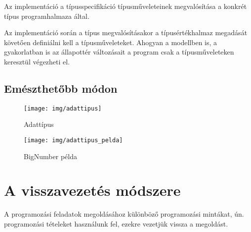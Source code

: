\documentclass[margin=0px]{article}
\begin{document}
Az implementáció a típusspecifikáció típusműveleteinek megvalósítása a konkrét típus programhalmaza által.

Az implementáció során a típus megvalósításakor a típusértékhalmaz megadását követően definiálni kell a típusműveleteket. Ahogyan a modellben is, a gyakorlatban is az állapottér változásait a program csak a típusműveleteken keresztül végezheti el.

\subsection{Emészthetőbb módon}

\begin{figure}[H]
    \centering
    \texttt{[image: img/adattipus]}
    \caption{Adattípus}
    \label{fig:adattipus}
\end{figure}

\begin{figure}[H]
    \centering
    \texttt{[image: img/adattipus\_pelda]}
    \caption{BigNumber példa}
    \label{fig:adattipus_pelda}
\end{figure}

\section{A visszavezetés módszere}

A programozási feladatok megoldásához különböző programozási mintákat, ún. programozási tételeket használunk fel, ezekre vezetjük vissza
a megoldást.\\
\end{document}
